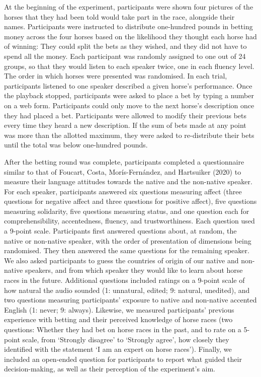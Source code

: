 \documentclass[
  man,floatsintext]{apa7}
\begin{document}
At the beginning of the experiment, participants were shown four pictures of the horses that they had been told would take part in the race, alongside their names. Participants were instructed to distribute one-hundred pounds in betting money across the four horses based on the likelihood they thought each horse had of winning: They could split the bets as they wished, and they did not have to spend all the money. Each participant was randomly assigned to one out of 24 groups, so that they would listen to each speaker twice, one in each fluency level. The order in which horses were presented was randomised. In each trial, participants listened to one speaker described a given horse's performance. Once the playback stopped, participants were asked to place a bet by typing a number on a web form. Participants could only move to the next horse's description once they had placed a bet. Participants were allowed to modify their previous bets every time they heard a new description. If the sum of bets made at any point was more than the allotted maximum, they were asked to re-distribute their bets until the total was below one-hundred pounds.

After the betting round was complete, participants completed a questionnaire similar to that of Foucart, Costa, Morís-Fernández, and Hartsuiker (2020) to measure their language attitudes towards the native and the non-native speaker. For each speaker, participants answered six questions measuring affect (three questions for negative affect and three questions for positive affect), five questions measuring solidarity, five questions measuring status, and one question each for comprehensibility, accentedness, fluency, and trustworthiness. Each question used a 9-point scale. Participants first answered questions about, at random, the native or non-native speaker, with the order of presentation of dimensions being randomised. They then answered the same questions for the remaining speaker. We also asked participants to guess the countries of origin of our native and non-native speakers, and from which speaker they would like to learn about horse races in the future. Additional questions included ratings on a 9-point scale of how natural the audio sounded (1: unnatural, edited; 9: natural, unedited), and two questions measuring participants' exposure to native and non-native accented English (1: never; 9: always). Likewise, we measured participants' previous experience with betting and their perceived knowledge of horse races (two questions: Whether they had bet on horse races in the past, and to rate on a 5-point scale, from `Strongly disagree' to `Strongly agree', how closely they identified with the statement `I am an expert on horse races'). Finally, we included an open-ended question for participants to report what guided their decision-making, as well as their perception of the experiment's aim.
\end{document}
